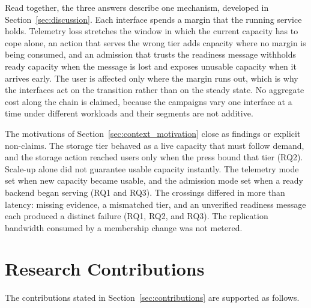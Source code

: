 ﻿\documentclass[12pt,reqno,twoside]{amsbook}
\begin{document}
Read together, the three answers describe one mechanism, developed in
Section~\ref{sec:discussion}. Each interface spends a margin that the running
service holds. Telemetry loss stretches the window in which the current
capacity has to cope alone, an action that serves the wrong tier adds capacity
where no margin is being consumed, and an admission that trusts the readiness
message withholds ready capacity when the message is lost and exposes unusable
capacity when it arrives early. The user is affected only where the
margin runs out, which is why the interfaces act on the transition rather than
on the steady state. No aggregate cost along the chain is claimed, because the
campaigns vary one interface at a time under different workloads and their
segments are not additive.

The motivations of Section~\ref{sec:context_motivation} close as findings or
explicit non-claims. The storage tier behaved as a live capacity that must
follow demand, and the storage action reached users only when the press bound
that tier (RQ2). Scale-up alone did not guarantee usable capacity instantly.
The telemetry mode set when new capacity became usable, and the admission
mode set when a ready backend began serving (RQ1 and RQ3). The crossings
differed in more than latency: missing evidence, a mismatched tier, and an
unverified readiness message each produced a distinct failure (RQ1, RQ2, and
RQ3). The replication bandwidth consumed by a membership change was not
metered.

\section{Research Contributions}\label{sec:contributions_revisited}
The contributions stated in Section~\ref{sec:contributions} are supported as
follows.
\end{document}
